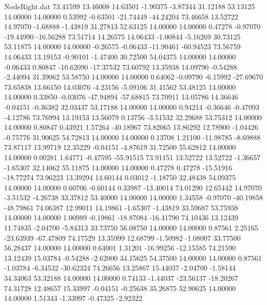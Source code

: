 \begin{filecontents}{NodeRight.dat}
  73.41599   13.46008   14.63501    -1.90375   -3.87344   31.12188   53.13125   14.00000   14.00000    0.53992   -0.63501  -21.74449  -44.24204
  73.46658   13.52722   14.97070    -1.68888   -1.43819   31.27813   52.63125   14.00000   14.00000    0.47278   -0.97070  -19.44990  -16.56288
  73.51714   14.26575   14.06433    -1.00844   -5.16269   30.73125   53.11875   14.00000   14.00000   -0.26575   -0.06433  -11.90461  -60.94523
  73.56759   14.06433   13.19153    -0.90101   -1.47400   30.72500   54.04375   14.00000   14.00000   -0.06433    0.80847  -10.62090  -17.37532
  73.60792   13.35938   14.09790    -0.54288   -2.44094   31.39062   53.58750   14.00000   14.00000    0.64062   -0.09790   -6.15992  -27.69670
  73.65838   13.66150   14.03076    -4.23156   -5.09106   31.41562   53.48125   14.00000   14.00000    0.33850   -0.03076  -47.94894  -57.68815
  73.70911   13.05786   14.36646    -0.04151   -0.36382   32.03437   53.17188   14.00000   14.00000    0.94214   -0.36646   -0.47093   -4.12786
  73.76994   13.19153   13.56079     0.13756   -3.51532   32.29688   53.75312   14.00000   14.00000    0.80847    0.43921    1.57264  -40.18967
  73.82065   13.86292   12.78900    -1.04426   -0.75776   31.90625   54.72813   14.00000   14.00000    0.13708    1.21100  -11.98785   -8.69888
  73.87117   13.99719   12.35229    -0.04151   -4.87619   31.72500   55.62812   14.00000   14.00000    0.00281    1.64771   -0.47595  -55.91515
  73.91151   13.52722   13.52722    -1.36657   -1.65307   32.14062   55.11875   14.00000   14.00000    0.47278    0.47278  -15.51916  -18.77274
  73.96223   13.39294   14.60144     0.03012   -1.18750   32.48438   54.09375   14.00000   14.00000    0.60706   -0.60144    0.33987  -13.40014
  74.01290   12.65442   14.97070    -3.51532   -4.26738   33.37812   53.40000   14.00000   14.00000    1.34558   -0.97070  -40.19858  -48.79861
  74.06387   12.99011   14.19861    -1.65307   -1.43819   33.59687   53.75938   14.00000   14.00000    1.00989   -0.19861  -18.87084  -16.41790
  74.10436   13.12439   11.74835    -2.04700   -5.84313   33.73750   56.08750   14.00000   14.00000    0.87561    2.25165  -23.63939  -67.47809
  74.17529   13.35999   12.68799    -1.50982   -1.08007   33.77500   56.28437   14.00000   14.00000    0.64001    1.31201  -16.99256  -12.15585
  74.21590   13.12439   15.03784    -0.54288   -2.62000   34.15625   54.37500   14.00000   14.00000    0.87561   -1.03784   -6.34532  -30.62324
  74.26656   13.25867   15.44037    -2.04700   -1.58144   34.34063   53.32188   14.00000   14.00000    0.74133   -1.44037  -23.56137  -18.20267
  74.31728   12.48657   15.33997    -0.04151   -0.25638   35.26875   52.90625   14.00000   14.00000    1.51343   -1.33997   -0.47325   -2.92322

\end{filecontents}
